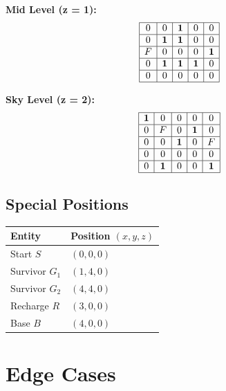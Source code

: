 \documentclass[12pt]{article}
\begin{document}
\textbf{Mid Level (z = 1):}
\[
\begin{array}{|c|c|c|c|c|}
\hline
0  & 0  & \mathbf{1} & 0  & 0 \\
\hline
0  & \mathbf{1} & \mathbf{1} & 0  & 0 \\
\hline
F  & 0  & 0  & 0  & \mathbf{1} \\
\hline
0  & \mathbf{1} & \mathbf{1} & \mathbf{1} & 0 \\
\hline
0  & 0  & 0  & 0  & 0 \\
\hline
\end{array}
\]

\textbf{Sky Level (z = 2):}
\[
\begin{array}{|c|c|c|c|c|}
\hline
\mathbf{1} & 0  & 0  & 0  & 0 \\
\hline
0  & F  & 0  & \mathbf{1} & 0 \\
\hline
0  & 0  & \mathbf{1} & 0  & F \\
\hline
0  & 0  & 0  & 0  & 0 \\
\hline
0  & \mathbf{1} & 0  & 0  & \mathbf{1} \\
\hline
\end{array}
\]

\subsection{Special Positions}

\begin{center}
\begin{tabular}{@{} l l @{}}
\toprule
\textbf{Entity} & \textbf{Position $(x, y, z)$} \\
\midrule
Start $S$         & $(0, 0, 0)$ \\
Survivor $G_1$    & $(1, 4, 0)$ \\
Survivor $G_2$    & $(4, 4, 0)$ \\
Recharge $R$      & $(3, 0, 0)$ \\
Base $B$          & $(4, 0, 0)$ \\
\bottomrule
\end{tabular}
\end{center}

\section{Edge Cases}
\end{document}
